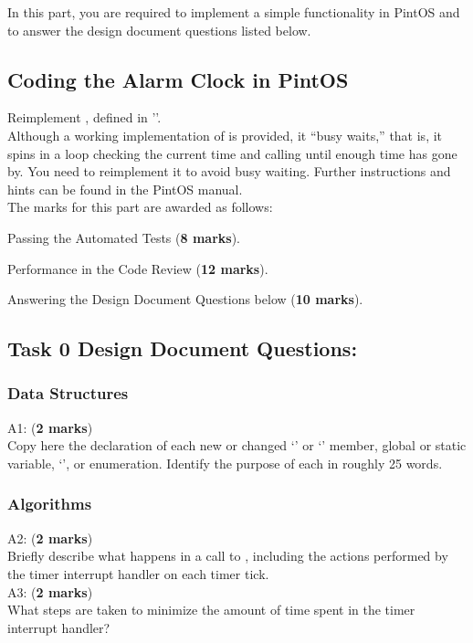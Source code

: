 \documentclass[a4paper,11pt]{article}
\begin{document}
In this part, you are required to implement a simple functionality in PintOS and to answer the design document questions listed below.

\subsection*{Coding the Alarm Clock in PintOS}
Reimplement , defined in '’.\\ 

\noindent Although a working implementation of  is provided, it “busy waits,” that is, 
it spins in a loop checking the current time and calling  until enough time has gone by. 
You need to reimplement it to avoid busy waiting. 
Further instructions and hints can be found in the PintOS manual.\\

\noindent The marks for this part are awarded as follows:

Passing the Automated Tests ({\bf 8 marks}).

Performance in the Code Review ({\bf 12 marks}). 

Answering the Design Document Questions below ({\bf 10 marks}).

\subsection*{Task 0 Design Document Questions:}

\subsubsection*{Data Structures}
A1: ({\bf 2 marks}) \\
Copy here the declaration of each new or changed `' or `' member, 
global or static variable, `', or enumeration.
Identify the purpose of each in roughly 25 words.

\subsubsection*{Algorithms}
A2: ({\bf 2 marks}) \\
Briefly describe what happens in a call to , including the actions performed by the timer interrupt handler on each timer tick. \\

\noindent A3: ({\bf 2 marks}) \\
What steps are taken to minimize the amount of time spent in the timer interrupt handler?
\end{document}
